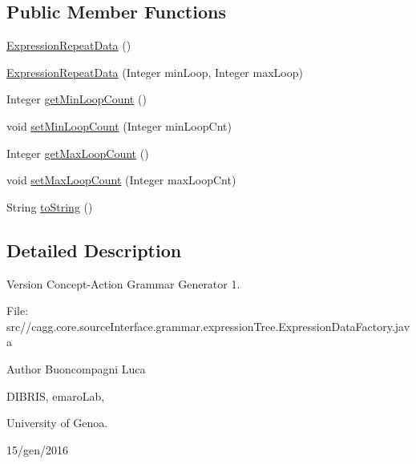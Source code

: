 \subsection*{Public Member Functions}
\begin{DoxyCompactItemize}
\item 
\hyperlink{classit_1_1emarolab_1_1cagg_1_1core_1_1language_1_1syntax_1_1expressionTree_1_1ExpressionDataFactory_1_1ExpressionRepeatData_a3667af707118686cff88c37d4c04d702}{Expression\-Repeat\-Data} ()
\item 
\hyperlink{classit_1_1emarolab_1_1cagg_1_1core_1_1language_1_1syntax_1_1expressionTree_1_1ExpressionDataFactory_1_1ExpressionRepeatData_a6ccb9c01ea9b52d1f73106fa8326951d}{Expression\-Repeat\-Data} (Integer min\-Loop, Integer max\-Loop)
\item 
Integer \hyperlink{classit_1_1emarolab_1_1cagg_1_1core_1_1language_1_1syntax_1_1expressionTree_1_1ExpressionDataFactory_1_1ExpressionRepeatData_ae1e0fe36da5a44ae9b38d85d576e8825}{get\-Min\-Loop\-Count} ()
\item 
void \hyperlink{classit_1_1emarolab_1_1cagg_1_1core_1_1language_1_1syntax_1_1expressionTree_1_1ExpressionDataFactory_1_1ExpressionRepeatData_a9a1fc512b7a605db3deeea63139ba7a3}{set\-Min\-Loop\-Count} (Integer min\-Loop\-Cnt)
\item 
Integer \hyperlink{classit_1_1emarolab_1_1cagg_1_1core_1_1language_1_1syntax_1_1expressionTree_1_1ExpressionDataFactory_1_1ExpressionRepeatData_a24f489f9e4e2376623e948959ef577f6}{get\-Max\-Loop\-Count} ()
\item 
void \hyperlink{classit_1_1emarolab_1_1cagg_1_1core_1_1language_1_1syntax_1_1expressionTree_1_1ExpressionDataFactory_1_1ExpressionRepeatData_a5e1cf13f2a58dd830e999810af8bc414}{set\-Max\-Loop\-Count} (Integer max\-Loop\-Cnt)
\item 
String \hyperlink{classit_1_1emarolab_1_1cagg_1_1core_1_1language_1_1syntax_1_1expressionTree_1_1ExpressionDataFactory_1_1ExpressionRepeatData_a20d67ab1ae6516b467dd79fa5a5c99e9}{to\-String} ()
\end{DoxyCompactItemize}


\subsection{Detailed Description}
\begin{DoxyVersion}{Version}
Concept-\/\-Action Grammar Generator 1. \par
 File\-: src//cagg.core.\-source\-Interface.\-grammar.\-expression\-Tree.\-Expression\-Data\-Factory.\-java \par

\end{DoxyVersion}
\begin{DoxyAuthor}{Author}
Buoncompagni Luca \par
 D\-I\-B\-R\-I\-S, emaro\-Lab,\par
 University of Genoa. \par
 15/gen/2016 \par

\end{DoxyAuthor}



